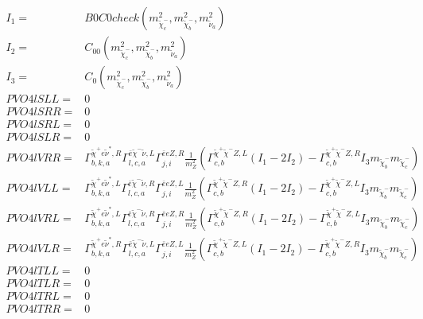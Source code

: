 \documentclass[A4,landscape]{article}
\begin{document}
\begin{align} 
I_1= & B0C0check(m^2_{\tilde{\chi}^-_{{c}}}, m^2_{\tilde{\chi}^-_{{b}}}, m^2_{\tilde{\nu}_{{a}}}) \\ 
I_2= & C_{00}(m^2_{\tilde{\chi}^-_{{c}}}, m^2_{\tilde{\chi}^-_{{b}}}, m^2_{\tilde{\nu}_{{a}}}) \\ 
I_3= & C_0(m^2_{\tilde{\chi}^-_{{c}}}, m^2_{\tilde{\chi}^-_{{b}}}, m^2_{\tilde{\nu}_{{a}}}) \\ 
  PVO4lSLL= & 0 \\ 
  PVO4lSRR= & 0 \\ 
  PVO4lSRL= & 0 \\ 
  PVO4lSLR= & 0 \\ 
  PVO4lVRR= &  \Gamma^{\tilde{\chi}^+e \tilde{\nu}^*,R}_{b, k, a} \Gamma^{\bar{e}\tilde{\chi}^- \tilde{\nu} ,L}_{l, c, a} \Gamma^{\bar{e}e Z ,R}_{j, i} \frac{1}{m^2_{Z}} (\Gamma^{\tilde{\chi}^+\tilde{\chi}^- Z ,L}_{c, b} (I_1 - 2 I_2) - \Gamma^{\tilde{\chi}^+\tilde{\chi}^- Z ,R}_{c, b} I_3 m_{\tilde{\chi}^-_{{b}}} m_{\tilde{\chi}^-_{{c}}}) \\ 
  PVO4lVLL= &  \Gamma^{\tilde{\chi}^+e \tilde{\nu}^*,L}_{b, k, a} \Gamma^{\bar{e}\tilde{\chi}^- \tilde{\nu} ,R}_{l, c, a} \Gamma^{\bar{e}e Z ,L}_{j, i} \frac{1}{m^2_{Z}} (\Gamma^{\tilde{\chi}^+\tilde{\chi}^- Z ,R}_{c, b} (I_1 - 2 I_2) - \Gamma^{\tilde{\chi}^+\tilde{\chi}^- Z ,L}_{c, b} I_3 m_{\tilde{\chi}^-_{{b}}} m_{\tilde{\chi}^-_{{c}}}) \\ 
  PVO4lVRL= &  \Gamma^{\tilde{\chi}^+e \tilde{\nu}^*,L}_{b, k, a} \Gamma^{\bar{e}\tilde{\chi}^- \tilde{\nu} ,R}_{l, c, a} \Gamma^{\bar{e}e Z ,R}_{j, i} \frac{1}{m^2_{Z}} (\Gamma^{\tilde{\chi}^+\tilde{\chi}^- Z ,R}_{c, b} (I_1 - 2 I_2) - \Gamma^{\tilde{\chi}^+\tilde{\chi}^- Z ,L}_{c, b} I_3 m_{\tilde{\chi}^-_{{b}}} m_{\tilde{\chi}^-_{{c}}}) \\ 
  PVO4lVLR= &  \Gamma^{\tilde{\chi}^+e \tilde{\nu}^*,R}_{b, k, a} \Gamma^{\bar{e}\tilde{\chi}^- \tilde{\nu} ,L}_{l, c, a} \Gamma^{\bar{e}e Z ,L}_{j, i} \frac{1}{m^2_{Z}} (\Gamma^{\tilde{\chi}^+\tilde{\chi}^- Z ,L}_{c, b} (I_1 - 2 I_2) - \Gamma^{\tilde{\chi}^+\tilde{\chi}^- Z ,R}_{c, b} I_3 m_{\tilde{\chi}^-_{{b}}} m_{\tilde{\chi}^-_{{c}}}) \\ 
  PVO4lTLL= & 0 \\ 
  PVO4lTLR= & 0 \\ 
  PVO4lTRL= & 0 \\ 
  PVO4lTRR= & 0 \\ 
\end{align} 
\end{document}
